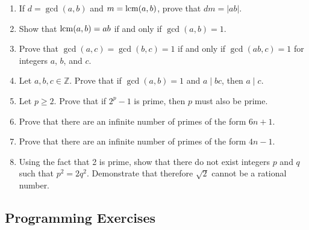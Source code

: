 {\begin{enumerate}
\item
If $d= \gcd(a, b)$ and $m = \operatorname{lcm}(a, b)$, prove that $dm = |ab|$.

\item
Show that $\operatorname{lcm}(a,b) = ab$ if and only if $\gcd(a,b) = 1$.

\item
Prove that $\gcd(a,c) = \gcd(b,c) =1$ if and only if $\gcd(ab,c) = 1$ for integers $a$, $b$, and $c$.

\item
Let $a, b, c \in {\mathbb Z}$.  Prove that if $\gcd(a,b) = 1$ and $a  \mid bc$, then $a  \mid  c$. 
 
\item
Let $p \geq 2$.  Prove that if $2^p-1$ is prime, then $p$ must also be prime.

\item
Prove that there are an infinite number of primes of the form $6n + 1$. 

\item
Prove that there are an infinite number of primes of the form $4n - 1$.

\item
Using the fact that 2 is prime, show that there do not exist integers $p$ and $q$ such that $p^2 = 2 q^2$.  Demonstrate that therefore $\sqrt{2}$ cannot be a rational number.  

\end{enumerate}
}
 
 
\subsection*{Programming Exercises}
 
